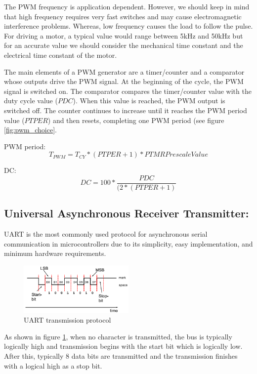 The PWM frequency is application dependent. However, we should keep in mind that high frequency requires very fast switches and may cause electromagnetic interference problems. Whereas, low frequency causes the load to follow the pulse.\\
For driving a motor, a typical value would range between 5kHz and 50kHz but for an accurate value we should consider the mechanical time constant and the electrical time constant of the motor.


The main elements of a PWM generator are a timer/counter and a comparator whose outputs drive the PWM signal. At the beginning of the cycle, the PWM signal is switched on. The comparator compares the timer/counter value with the duty cycle value ($PDC$). When this value is reached, the PWM output is switched off. The counter continues to increase until it reaches the PWM period value ($PTPER$) and then resets, completing one PWM period (see figure \ref{fig:pwm_choice}.

PWM period:
$$T_{PWM}=T_{CY}*(PTPER+1)*PTMR Prescale Value$$

DC: 
$$DC=100* \frac{PDC}{(2*(PTPER+1)}$$


\subsection{Universal Asynchronous Receiver Transmitter:}

UART is the most commonly used protocol for asynchronous serial communication in microcontrollers due to its simplicity, easy implementation, and minimum hardware requirements.\\

\begin{figure}[H]
    \centering
    \includegraphics[width=0.5\textwidth]{figures/software/UART_com.PNG}
    \caption{UART transmission protocol\cite{alex}}
    \label{fig:uartProtocol}
\end{figure}

As shown in figure \ref{fig:uartProtocol}, when no character is transmitted, the bus is typically logically high and transmission begins with the start bit which is logically low. After this, typically 8 data bits are transmitted and the transmission finishes with a logical high as a stop bit.\\

